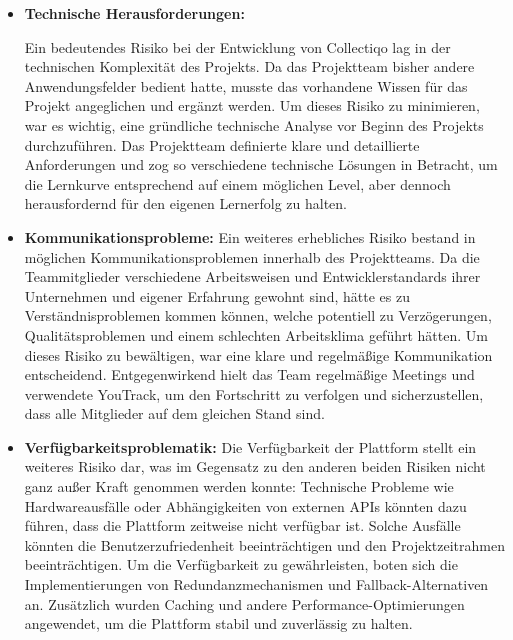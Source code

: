\begin{itemize}
    \item \textbf{Technische Herausforderungen:}

    Ein bedeutendes Risiko bei der Entwicklung von Collectiqo lag in der technischen Komplexität des Projekts.
    Da das Projektteam bisher andere Anwendungsfelder bedient hatte, musste das vorhandene Wissen für das Projekt angeglichen und ergänzt werden.
    Um dieses Risiko zu minimieren, war es wichtig, eine gründliche technische Analyse vor Beginn des Projekts durchzuführen.
    Das Projektteam definierte klare und detaillierte Anforderungen und zog so verschiedene technische Lösungen in Betracht, um die Lernkurve entsprechend auf einem möglichen Level, aber dennoch herausfordernd für den eigenen Lernerfolg zu halten.

    \item \textbf{Kommunikationsprobleme:}
    Ein weiteres erhebliches Risiko bestand in möglichen Kommunikationsproblemen innerhalb des Projektteams.
    Da die Teammitglieder verschiedene Arbeitsweisen und Entwicklerstandards ihrer Unternehmen und eigener Erfahrung gewohnt sind, hätte es zu Verständnisproblemen kommen können, welche potentiell zu Verzögerungen, Qualitätsproblemen und einem schlechten Arbeitsklima geführt hätten.
    Um dieses Risiko zu bewältigen, war eine klare und regelmäßige Kommunikation entscheidend.
    Entgegenwirkend hielt das Team regelmäßige Meetings und verwendete YouTrack, um den Fortschritt zu verfolgen und sicherzustellen, dass alle Mitglieder auf dem gleichen Stand sind.

    \item \textbf{Verfügbarkeitsproblematik:}
    Die Verfügbarkeit der Plattform stellt ein weiteres Risiko dar, was im Gegensatz zu den anderen beiden Risiken nicht ganz außer Kraft genommen werden konnte: %
    Technische Probleme wie Hardwareausfälle oder Abhängigkeiten von externen APIs könnten dazu führen, dass die Plattform zeitweise nicht verfügbar ist.
    Solche Ausfälle könnten die Benutzerzufriedenheit beeinträchtigen und den Projektzeitrahmen beeinträchtigen.
    Um die Verfügbarkeit zu gewährleisten, boten sich die Implementierungen von Redundanzmechanismen und Fallback-Alternativen an.
    Zusätzlich wurden Caching und andere Performance-Optimierungen angewendet, um die Plattform stabil und zuverlässig zu halten.

\end{itemize}



